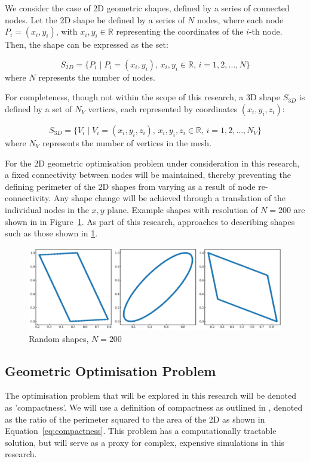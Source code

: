\documentclass{article}
\begin{document}
We consider the case of 2D geometric shapes, defined by a series of connected nodes.
Let the 2D shape be defined by a series of \(N\) nodes, where each node \(P_i = (x_i, y_i)\), with \(x_i, y_i \in \mathbb{R}\) representing the coordinates of the \(i\)-th node. Then, the shape can be expressed as the set:

\[
S_{2D} = \{ P_i \mid P_i = (x_i, y_i), \, x_i, y_i \in \mathbb{R}, \, i = 1, 2, \dots, N \}
\]
where \(N\) represents the number of nodes.

For completeness, though not within the scope of this research, a 3D shape \(S_{3D}\) is defined by a set of \(N_V\) vertices, each represented by coordinates \((x_i, y_i, z_i)\):

\[
S_{3D} = \{ V_i \mid V_i = (x_i, y_i, z_i), \, x_i, y_i, z_i \in \mathbb{R}, \, i = 1, 2, \dots, N_V \}
\]
where \(N_V\) represents the number of vertices in the mesh.

For the 2D geometric optimisation problem under consideration in this research, a fixed connectivity between nodes will be maintained, thereby preventing the defining perimeter of the 2D shapes from varying as a result of node re-connectivity. Any shape change will be achieved through a translation of the individual nodes in the $x,y$ plane. Example shapes with resolution of $N=200$ are shown in in Figure~\ref{fig:randomshapes}. As part of this research, approaches to describing shapes such as those shown in \ref{fig:randomshapes}.


\begin{figure}[htp]
    \centering
    \includegraphics[width=12cm]{figures/output.png}
    \caption{Random shapes, $N=200$}
    \label{fig:randomshapes}
\end{figure}


\subsection{Geometric Optimisation Problem}

The optimisation problem that will be explored in this research will be denoted as 'compactness'. We will use a definition of compactness as outlined in \citep{Bribiesca2008}, denoted as the ratio of the perimeter squared to the area of the 2D as shown in Equation~\eqref{eq:compactness}. This problem has a computationally tractable solution, but will serve as a proxy for complex, expensive simulations in this research. 
\end{document}
